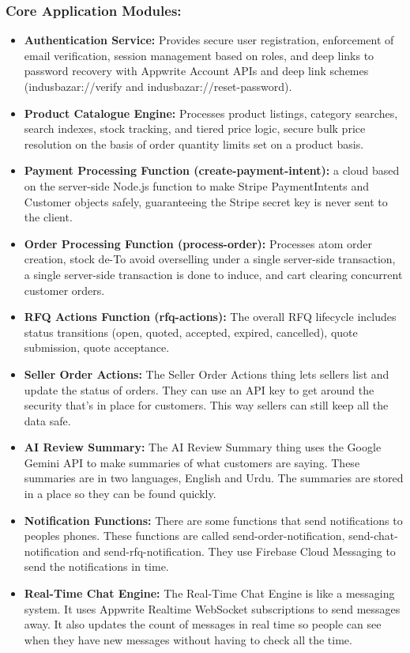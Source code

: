 \subsubsection{Core Application Modules:}
\begin{itemize}
    \item \textbf{Authentication Service:} Provides secure user registration, enforcement of email verification, session management based on roles, and deep links to password recovery with Appwrite Account APIs and deep link schemes (indusbazar://verify and indusbazar://reset-password).
    \item \textbf{Product Catalogue Engine:} Processes product listings, category searches, search indexes, stock tracking, and tiered price logic, secure bulk price resolution on the basis of order quantity limits set on a product basis.
    \item \textbf{Payment Processing Function (create-payment-intent):} a cloud based on the server-side Node.js function to make Stripe PaymentIntents and Customer objects safely, guaranteeing the Stripe secret key is never sent to the client.
    \item \textbf{Order Processing Function (process-order):} Processes atom order creation, stock de-To avoid overselling under a single server-side transaction, a single server-side transaction is done to induce, and cart clearing concurrent customer orders.
    \item \textbf{RFQ Actions Function (rfq-actions):} The overall RFQ lifecycle includes status transitions (open, quoted, accepted, expired, cancelled), quote submission, quote acceptance.
    \item \textbf{Seller Order Actions:} The Seller Order Actions thing lets sellers list and update the status of orders. They can use an API key to get around the security that's in place for customers. This way sellers can still keep all the data safe.
    \item \textbf{AI Review Summary:} The AI Review Summary thing uses the Google Gemini API to make summaries of what customers are saying. These summaries are in two languages, English and Urdu. The summaries are stored in a place so they can be found quickly.
    \item \textbf{Notification Functions:} There are some functions that send notifications to peoples phones. These functions are called send-order-notification, send-chat-notification and send-rfq-notification. They use Firebase Cloud Messaging to send the notifications in time.
    \item \textbf{Real-Time Chat Engine:} The Real-Time Chat Engine is like a messaging system. It uses Appwrite Realtime WebSocket subscriptions to send messages away. It also updates the count of messages in real time so people can see when they have new messages without having to check all the time.

\end{itemize}

